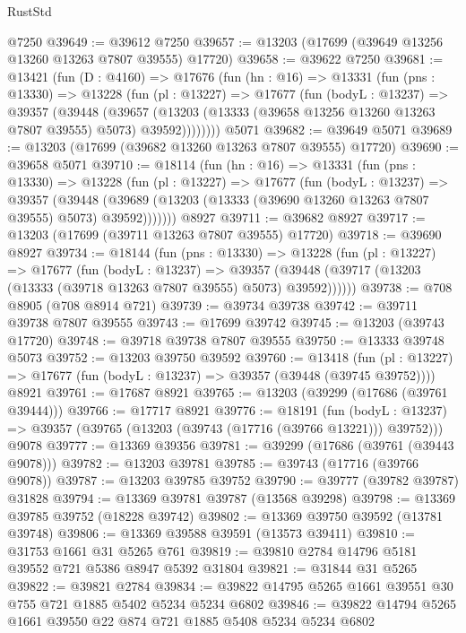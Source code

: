 \begin{lexlean}{RustStd}
\begin{coremodule}
    @7250
@39649 := @39612 @7250
@39657 := @13203 (@17699 (@39649 @13256 @13260 @13263 @7807 @39555) @17720)
@39658 := @39622 @7250
@39681 := @13421
    (fun (D : @4160) =>
    @17676
      (fun (hn : @16) =>
      @13331
        (fun (pns : @13330) =>
        @13228
          (fun (pl : @13227) =>
          @17677
            (fun (bodyL : @13237) =>
            @39357
              (@39448
                (@39657
                  (@13203 (@13333 (@39658 @13256 @13260 @13263 @7807 @39555) @5073) @39592))))))))
    @5071
@39682 := @39649 @5071
@39689 := @13203 (@17699 (@39682 @13260 @13263 @7807 @39555) @17720)
@39690 := @39658 @5071
@39710 := @18114
    (fun (hn : @16) =>
    @13331
      (fun (pns : @13330) =>
      @13228
        (fun (pl : @13227) =>
        @17677
          (fun (bodyL : @13237) =>
          @39357
            (@39448 (@39689 (@13203 (@13333 (@39690 @13260 @13263 @7807 @39555) @5073) @39592)))))))
    @8927
@39711 := @39682 @8927
@39717 := @13203 (@17699 (@39711 @13263 @7807 @39555) @17720)
@39718 := @39690 @8927
@39734 := @18144
    (fun (pns : @13330) =>
    @13228
      (fun (pl : @13227) =>
      @17677
        (fun (bodyL : @13237) =>
        @39357 (@39448 (@39717 (@13203 (@13333 (@39718 @13263 @7807 @39555) @5073) @39592))))))
@39738 := @708 @8905 (@708 @8914 @721)
@39739 := @39734 @39738
@39742 := @39711 @39738 @7807 @39555
@39743 := @17699 @39742
@39745 := @13203 (@39743 @17720)
@39748 := @39718 @39738 @7807 @39555
@39750 := @13333 @39748 @5073
@39752 := @13203 @39750 @39592
@39760 := @13418
    (fun (pl : @13227) => @17677 (fun (bodyL : @13237) => @39357 (@39448 (@39745 @39752))))
    @8921
@39761 := @17687 @8921
@39765 := @13203 (@39299 (@17686 (@39761 @39444)))
@39766 := @17717 @8921
@39776 := @18191
    (fun (bodyL : @13237) => @39357 (@39765 (@13203 (@39743 (@17716 (@39766 @13221))) @39752)))
    @9078
@39777 := @13369 @39356
@39781 := @39299 (@17686 (@39761 (@39443 @9078)))
@39782 := @13203 @39781
@39785 := @39743 (@17716 (@39766 @9078))
@39787 := @13203 @39785 @39752
@39790 := @39777 (@39782 @39787) @31828
@39794 := @13369 @39781 @39787 (@13568 @39298)
@39798 := @13369 @39785 @39752 (@18228 @39742)
@39802 := @13369 @39750 @39592 (@13781 @39748)
@39806 := @13369 @39588 @39591 (@13573 @39411)
@39810 := @31753 @1661 @31 @5265 @761
@39819 := @39810 @2784 @14796 @5181 @39552 @721 @5386 @8947 @5392 @31804
@39821 := @31844 @31 @5265
@39822 := @39821 @2784
@39834 := @39822 @14795 @5265 @1661 @39551 @30 @755 @721 @1885 @5402 @5234 @5234 @6802
@39846 := @39822 @14794 @5265 @1661 @39550 @22 @874 @721 @1885 @5408 @5234 @5234 @6802

\end{coremodule}
\end{lexlean}
